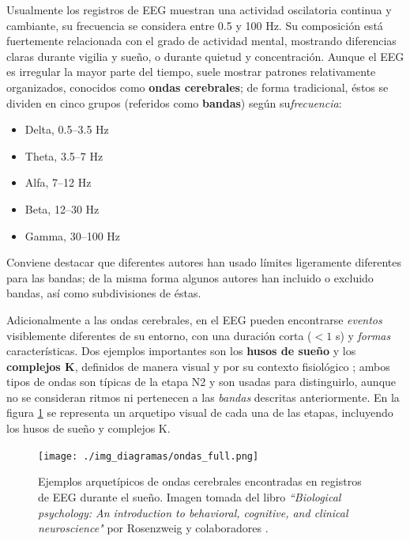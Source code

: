 \documentclass[12pt,letterpaper]{book}
\newcommand{\hz}{\si{\hertz}\xspace}
\begin{document}
Usualmente los registros de EEG muestran una actividad oscilatoria continua y cambiante, su frecuencia se considera entre 0.5 y 100 \hz. 
%
Su composición está fuertemente relacionada con el grado de actividad mental, mostrando diferencias claras durante vigilia y sueño, o durante quietud y concentración.
%
Aunque el EEG es irregular la mayor parte del tiempo, suele mostrar patrones relativamente organizados, conocidos como \textbf{ondas cerebrales}; de forma tradicional, éstos se dividen en cinco grupos (referidos como \textbf{bandas}) según su\textit{frecuencia}:
\begin{itemize}
\item Delta, 0.5--3.5 \hz
\item Theta, 3.5--7 \hz
\item Alfa, 7--12 \hz
\item Beta, 12--30 \hz
\item Gamma, 30--100 \hz
\end{itemize}

Conviene destacar que diferentes autores han usado límites ligeramente diferentes para las bandas; de la misma forma algunos autores han incluido o excluido bandas, así como subdivisiones de éstas.

Adicionalmente a las ondas cerebrales, en el EEG pueden encontrarse \textit{eventos} visiblemente diferentes de su entorno, con una duración corta ($<1$ s) y \textit{formas} características.
%
Dos ejemplos importantes son los \textbf{husos de sueño} y los \textbf{complejos K}, definidos de manera visual y por su contexto fisiológico \cite{AASM07}; ambos tipos de ondas son típicas de la etapa N2 y son usadas para distinguirlo, aunque no se consideran ritmos ni pertenecen a las \textit{bandas} descritas anteriormente.
%
En la figura \ref{ritmos} se representa un arquetipo visual de cada una de las etapas, incluyendo los husos de sueño y complejos K.

\begin{figure}
\centering
\texttt{[image: ./img\_diagramas/ondas\_full.png]} 
\caption[Ejemplos de ondas cerebrales encontradas en el EEG]
{Ejemplos arquetípicos de ondas cerebrales encontradas en registros de EEG durante el sueño. Imagen tomada del libro \textit{``Biological psychology: An introduction to behavioral, cognitive, and clinical neuroscience"} por Rosenzweig y colaboradores \cite{rosenzweig02}.}
\label{ritmos}
\end{figure}
\end{document}
